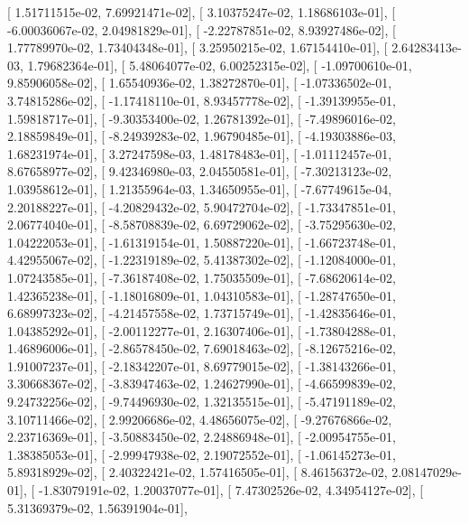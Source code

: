 \documentclass{article}
\begin{document}
       [  1.51711515e-02,   7.69921471e-02],
       [  3.10375247e-02,   1.18686103e-01],
       [ -6.00036067e-02,   2.04981829e-01],
       [ -2.22787851e-02,   8.93927486e-02],
       [  1.77789970e-02,   1.73404348e-01],
       [  3.25950215e-02,   1.67154410e-01],
       [  2.64283413e-03,   1.79682364e-01],
       [  5.48064077e-02,   6.00252315e-02],
       [ -1.09700610e-01,   9.85906058e-02],
       [  1.65540936e-02,   1.38272870e-01],
       [ -1.07336502e-01,   3.74815286e-02],
       [ -1.17418110e-01,   8.93457778e-02],
       [ -1.39139955e-01,   1.59818717e-01],
       [ -9.30353400e-02,   1.26781392e-01],
       [ -7.49896016e-02,   2.18859849e-01],
       [ -8.24939283e-02,   1.96790485e-01],
       [ -4.19303886e-03,   1.68231974e-01],
       [  3.27247598e-03,   1.48178483e-01],
       [ -1.01112457e-01,   8.67658977e-02],
       [  9.42346980e-03,   2.04550581e-01],
       [ -7.30213123e-02,   1.03958612e-01],
       [  1.21355964e-03,   1.34650955e-01],
       [ -7.67749615e-04,   2.20188227e-01],
       [ -4.20829432e-02,   5.90472704e-02],
       [ -1.73347851e-01,   2.06774040e-01],
       [ -8.58708839e-02,   6.69729062e-02],
       [ -3.75295630e-02,   1.04222053e-01],
       [ -1.61319154e-01,   1.50887220e-01],
       [ -1.66723748e-01,   4.42955067e-02],
       [ -1.22319189e-02,   5.41387302e-02],
       [ -1.12084000e-01,   1.07243585e-01],
       [ -7.36187408e-02,   1.75035509e-01],
       [ -7.68620614e-02,   1.42365238e-01],
       [ -1.18016809e-01,   1.04310583e-01],
       [ -1.28747650e-01,   6.68997323e-02],
       [ -4.21457558e-02,   1.73715749e-01],
       [ -1.42835646e-01,   1.04385292e-01],
       [ -2.00112277e-01,   2.16307406e-01],
       [ -1.73804288e-01,   1.46896006e-01],
       [ -2.86578450e-02,   7.69018463e-02],
       [ -8.12675216e-02,   1.91007237e-01],
       [ -2.18342207e-01,   8.69779015e-02],
       [ -1.38143266e-01,   3.30668367e-02],
       [ -3.83947463e-02,   1.24627990e-01],
       [ -4.66599839e-02,   9.24732256e-02],
       [ -9.74496930e-02,   1.32135515e-01],
       [ -5.47191189e-02,   3.10711466e-02],
       [  2.99206686e-02,   4.48656075e-02],
       [ -9.27676866e-02,   2.23716369e-01],
       [ -3.50883450e-02,   2.24886948e-01],
       [ -2.00954755e-01,   1.38385053e-01],
       [ -2.99947938e-02,   2.19072552e-01],
       [ -1.06145273e-01,   5.89318929e-02],
       [  2.40322421e-02,   1.57416505e-01],
       [  8.46156372e-02,   2.08147029e-01],
       [ -1.83079191e-02,   1.20037077e-01],
       [  7.47302526e-02,   4.34954127e-02],
       [  5.31369379e-02,   1.56391904e-01],
\end{document}

